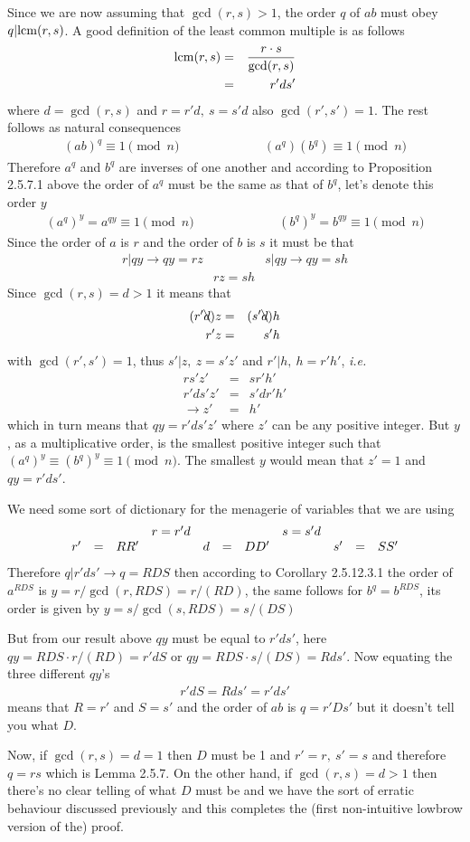 \documentclass[aps,preprint,preprintnumbers,nofootinbib,showpacs,prd]{revtex4-1}
\newcommand{\ie}{{\it i.e.} }
\newcommand{\ba}{\begin{array}}
\newcommand{\ea}{\end{array}}
\newcommand{\nbea}{\begin{eqnarray*}}
\newcommand{\neea}{\end{eqnarray*}}
\begin{document}
Since we are now assuming that $\gcd(r,s) > 1$, the order $q$ of $ab$ must obey $q |{\rm lcm}(r,s)$. A good definition of the least common multiple is as follows
%
\nbea
{\rm lcm}(r,s) & = & \frac{r \cdot s}{\gcd(r,s)} \\
& = & r' d s'
\neea
%
where $d = \gcd(r,s)$ and $r = r'd, ~ s = s'd$ also $\gcd(r',s') = 1$. The rest follows as natural consequences
%
\nbea
(ab)^q \equiv 1 \pmod{n} & ~~~~~~~~~~~~~~~~~~~~~~~ & (a^q)(b^q) \equiv 1 \pmod{n}
\neea
%
Therefore $a^q$ and $b^q$ are inverses of one another and according to Proposition 2.5.7.1 above the order of $a^q$ must be the same as that of $b^q$, let's denote this order $y$
%
\nbea
(a^q)^y  = a^{qy} \equiv 1 \pmod{n} & ~~~~~~~~~~~~~~~~~~~~~~~ & (b^q)^y  = b^{qy} \equiv 1 \pmod{n}
\neea
%
Since the order of $a$ is $r$ and the order of $b$ is $s$ it must be that
%
\nbea
r | qy \to qy = rz & & s | qy \to qy = sh \\
& rz = sh &
\neea
%
Since $\gcd(r,s) = d > 1$ it means that 
%
\nbea
(r' \bcancel{d}) z & = & (s' \bcancel{d}) h \\
r' z & = & s' h
\neea
%
with $\gcd(r',s') = 1$, thus $s'|z, ~z = s'z'$ and $r'|h, ~h = r'h'$, \ie
%
\nbea
rs'z' & = & sr'h' \\
r'ds'z' & = & s'dr'h' \\
\to z' & = & h'
\neea
%
which in turn means that $qy = r'ds' z'$ where $z'$ can be any positive integer. But $y$, as a multiplicative order, is the smallest positive integer such that $(a^q)^y \equiv (b^q)^y \equiv 1 \pmod{n}$. The smallest $y$ would mean that $z' = 1$ and $qy = r' d s'$.


We need some sort of dictionary for the menagerie of variables that we are using
%
\nbea
\ba{r c l c r c l c r c l}
&&& r = r' d &&&& s = s' d \\
r' & = & R R' & ~~~ & d & = & D D' & ~~~ & s' & = & S S'
\ea
\neea
%
Therefore $q|r'ds' \to q = R D S$ then according to Corollary 2.5.12.3.1 the order of $a^{R D S}$ is $y = r/\gcd(r,R D S) = r/(R D)$, the same follows for $b^q = b^{R D S}$, its order is given by $y = s/\gcd(s,R D S) = s/(D S)$

But from our result above $qy$ must be equal to $r' d s'$, here $qy = R D S \cdot r/(R D) = r' d S$ or $qy =R D S \cdot s/(D S) = R d s'$. Now equating the three different $qy$'s
%
\nbea
r' d S = R d s' = r' d s'
\neea
%
means that $R = r'$ and $S = s'$ and the order of $ab$ is $q = r' D s'$ but it doesn't tell you what $D$.

Now, if $\gcd(r,s) = d = 1$ then $D$ must be 1 and $r' = r, ~s' = s$ and therefore $q = rs$ which is Lemma 2.5.7. On the other hand, if $\gcd(r,s) = d > 1$ then there's no clear telling of what $D$ must be and we have the sort of erratic behaviour discussed previously and this completes the (first non-intuitive lowbrow version of the) proof.
\end{document}
